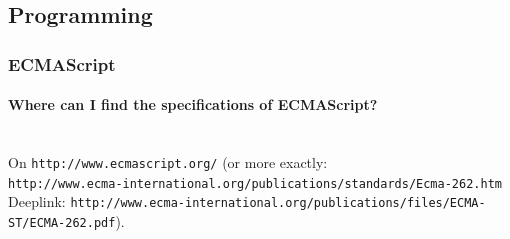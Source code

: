 \documentclass[10pt]{scrbook}
\begin{document}
\subsection{Programming}

\subsubsection{ECMAScript}

\paragraph{Where can I find the specifications of ECMAScript?} ~ \\
On \verb|http://www.ecmascript.org/| (or more exactly: \\
\verb|http://www.ecma-international.org/publications/standards/Ecma-262.htm| \\
Deeplink: \verb|http://www.ecma-international.org/publications/files/ECMA-ST/ECMA-262.pdf|).
\end{document}
